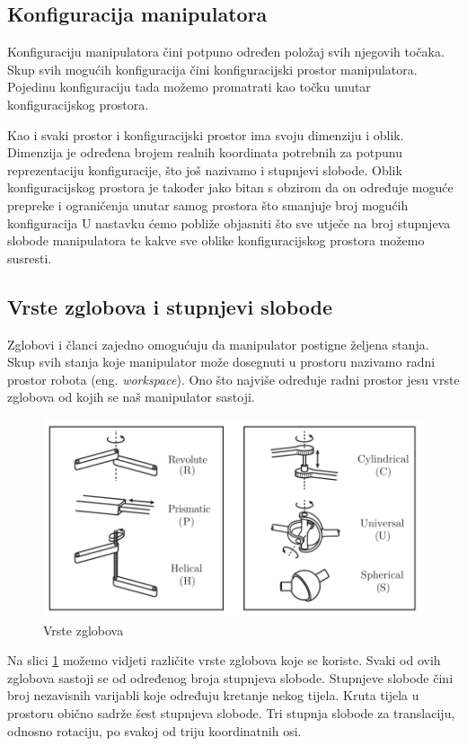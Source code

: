 \documentclass[times, utf8, diplomskirad]{fer}
\begin{document}
\subsection{Konfiguracija manipulatora}
Konfiguraciju manipulatora čini potpuno određen položaj svih njegovih točaka.
Skup svih mogućih konfiguracija čini konfiguracijski prostor manipulatora.
Pojedinu konfiguraciju tada možemo promatrati kao točku unutar konfiguracijskog prostora.

Kao i svaki prostor i konfiguracijski prostor ima svoju dimenziju i oblik.
Dimenzija je određena brojem realnih koordinata potrebnih za potpunu reprezentaciju konfiguracije, što još nazivamo i stupnjevi slobode.
Oblik konfiguracijskog prostora je također jako bitan s obzirom da on određuje moguće prepreke i ograničenja unutar samog prostora što smanjuje broj mogućih konfiguracija
U nastavku ćemo pobliže objasniti što sve utječe na broj stupnjeva slobode manipulatora te kakve sve oblike konfiguracijskog prostora možemo susresti.

\subsection{Vrste zglobova i stupnjevi slobode}
Zglobovi i članci zajedno omogućuju da manipulator postigne željena stanja.
Skup svih stanja koje manipulator može dosegnuti u prostoru nazivamo radni prostor robota (eng. \textit{workspace}).
Ono što najviše određuje radni prostor jesu vrste zglobova od kojih se naš manipulator sastoji.

\begin{figure}[H]
    \centering
    \includegraphics[width=12cm]{img/robot-joints}
    \caption{Vrste zglobova}
    \label{fig:robot-joints}
\end{figure}
Na slici \ref{fig:robot-joints} možemo vidjeti različite vrste zglobova koje se koriste.
Svaki od ovih zglobova sastoji se od određenog broja stupnjeva slobode.
Stupnjeve slobode čini broj nezavisnih varijabli koje određuju kretanje nekog tijela.
Kruta tijela u prostoru obično sadrže šest stupnjeva slobode.
Tri stupnja slobode za translaciju, odnosno rotaciju, po svakoj od triju koordinatnih osi.
\end{document}

